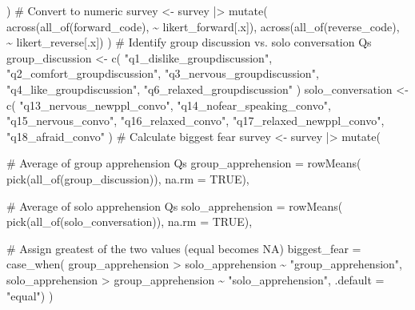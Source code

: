 \documentclass[
  11pt,
  letterpaper,
]{article}
\newenvironment{Shaded}{\begin{snugshade}}{\end{snugshade}}
\newcommand{\AttributeTok}[1]{\textcolor[rgb]{0.40,0.45,0.13}{#1}}
\newcommand{\CommentTok}[1]{\textcolor[rgb]{0.37,0.37,0.37}{#1}}
\newcommand{\ConstantTok}[1]{\textcolor[rgb]{0.56,0.35,0.01}{#1}}
\newcommand{\FunctionTok}[1]{\textcolor[rgb]{0.28,0.35,0.67}{#1}}
\newcommand{\NormalTok}[1]{\textcolor[rgb]{0.00,0.23,0.31}{#1}}
\newcommand{\OtherTok}[1]{\textcolor[rgb]{0.00,0.23,0.31}{#1}}
\newcommand{\SpecialCharTok}[1]{\textcolor[rgb]{0.37,0.37,0.37}{#1}}
\newcommand{\StringTok}[1]{\textcolor[rgb]{0.13,0.47,0.30}{#1}}
\begin{document}
\begin{Shaded}
\begin{Highlighting}[]
\NormalTok{)}
\CommentTok{\# Convert to numeric}
\NormalTok{survey }\OtherTok{\textless{}{-}}\NormalTok{ survey }\SpecialCharTok{|\textgreater{}}
  \FunctionTok{mutate}\NormalTok{(}
    \FunctionTok{across}\NormalTok{(}\FunctionTok{all\_of}\NormalTok{(forward\_code), }\SpecialCharTok{\textasciitilde{}}\NormalTok{ likert\_forward[.x]),}
    \FunctionTok{across}\NormalTok{(}\FunctionTok{all\_of}\NormalTok{(reverse\_code), }\SpecialCharTok{\textasciitilde{}}\NormalTok{ likert\_reverse[.x])}
\NormalTok{  )}
\CommentTok{\# Identify group discussion vs. solo conversation Q\textquotesingle{}s}
\NormalTok{group\_discussion }\OtherTok{\textless{}{-}} \FunctionTok{c}\NormalTok{(}
  \StringTok{"q1\_dislike\_groupdiscussion"}\NormalTok{, }\StringTok{"q2\_comfort\_groupdiscussion"}\NormalTok{,}
  \StringTok{"q3\_nervous\_groupdiscussion"}\NormalTok{, }\StringTok{"q4\_like\_groupdiscussion"}\NormalTok{,}
  \StringTok{"q6\_relaxed\_groupdiscussion"}
\NormalTok{  )}
\NormalTok{solo\_conversation }\OtherTok{\textless{}{-}} \FunctionTok{c}\NormalTok{(}
  \StringTok{"q13\_nervous\_newppl\_convo"}\NormalTok{, }\StringTok{"q14\_nofear\_speaking\_convo"}\NormalTok{,}
  \StringTok{"q15\_nervous\_convo"}\NormalTok{,        }\StringTok{"q16\_relaxed\_convo"}\NormalTok{,}
  \StringTok{"q17\_relaxed\_newppl\_convo"}\NormalTok{, }\StringTok{"q18\_afraid\_convo"}
\NormalTok{  )}
\CommentTok{\# Calculate biggest fear}
\NormalTok{survey }\OtherTok{\textless{}{-}}\NormalTok{ survey }\SpecialCharTok{|\textgreater{}} 
  \FunctionTok{mutate}\NormalTok{(}
    
\CommentTok{\#   Average of group apprehension Q\textquotesingle{}s}
    \AttributeTok{group\_apprehension =} \FunctionTok{rowMeans}\NormalTok{(}
      \FunctionTok{pick}\NormalTok{(}\FunctionTok{all\_of}\NormalTok{(group\_discussion)), }\AttributeTok{na.rm =} \ConstantTok{TRUE}\NormalTok{),}
    
\CommentTok{\#   Average of solo apprehension Q\textquotesingle{}s}
    \AttributeTok{solo\_apprehension =} \FunctionTok{rowMeans}\NormalTok{(}
      \FunctionTok{pick}\NormalTok{(}\FunctionTok{all\_of}\NormalTok{(solo\_conversation)), }\AttributeTok{na.rm =} \ConstantTok{TRUE}\NormalTok{),}

\CommentTok{\#   Assign greatest of the two values (equal becomes NA)}
    \AttributeTok{biggest\_fear =} \FunctionTok{case\_when}\NormalTok{(}
\NormalTok{      group\_apprehension }\SpecialCharTok{\textgreater{}}\NormalTok{ solo\_apprehension }\SpecialCharTok{\textasciitilde{}} \StringTok{"group\_apprehension"}\NormalTok{,}
\NormalTok{      solo\_apprehension }\SpecialCharTok{\textgreater{}}\NormalTok{ group\_apprehension }\SpecialCharTok{\textasciitilde{}} \StringTok{"solo\_apprehension"}\NormalTok{,}
      \AttributeTok{.default =} \StringTok{"equal"}\NormalTok{)}
\NormalTok{  )}
\end{Highlighting}
\end{Shaded}
\end{document}
